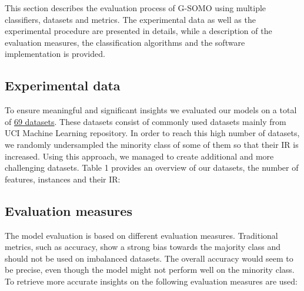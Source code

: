 \documentclass[parskip=full]{scrartcl}
\begin{document}
This section describes the evaluation process of G-SOMO using multiple classifiers, datasets and metrics. The experimental data as well as the experimental procedure are presented in details, while a description of the evaluation measures, the classification algorithms and the software implementation is provided.

\subsection{Experimental data}

To ensure meaningful and significant insights we evaluated our models on a total of \href{https://github.com/AlgoWit/publications/blob/master/gsomo/data/gsomo.db}{69 datasets}. These datasets consist of commonly used datasets mainly from UCI Machine Learning repository. In order to reach this high number of datasets, we randomly undersampled the minority class of some of them so that their IR is increased. Using this approach, we managed to create additional and more challenging datasets. Table 1 provides an overview of our datasets, the number of features, instances and their IR:


\subsection{Evaluation measures}

The model evaluation is based on different evaluation measures. Traditional metrics, such as accuracy, show a strong bias towards the majority class and should not be used on imbalanced datasets. The overall accuracy would seem to be precise, even though the model might not perform well on the minority class. To retrieve more accurate insights on the following evaluation measures are used:
\end{document}

